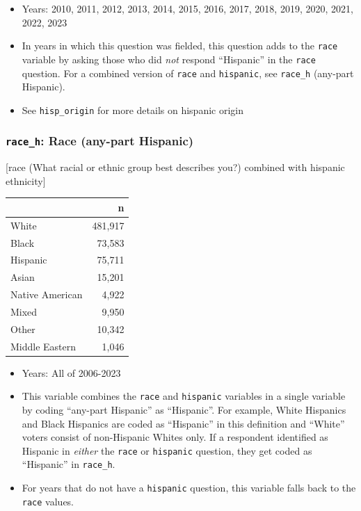 \documentclass[10pt,article,oneside]{memoir}
\theoremstyle{definition}
\begin{document}
\begin{itemize}
\tightlist
\item
  Years: 2010, 2011, 2012, 2013, 2014, 2015, 2016, 2017, 2018, 2019,
  2020, 2021, 2022, 2023
\item
  In years in which this question was fielded, this question adds to the
  \texttt{race} variable by asking those who did \emph{not} respond
  ``Hispanic'' in the \texttt{race} question. For a combined version of
  \texttt{race} and \texttt{hispanic}, see \texttt{race\_h} (any-part
  Hispanic).
\item
  See \texttt{hisp\_origin} for more details on hispanic origin
\end{itemize}

\subsubsection{\texorpdfstring{\texttt{race\_h}: Race (any-part
Hispanic)}{race\_h: Race (any-part Hispanic)}}\label{race_h-race-any-part-hispanic}

{[}race (What racial or ethnic group best describes you?) combined with
hispanic ethnicity{]}

\begin{table}[H]
\centering
\begin{tabular}[t]{lr}
\toprule
 & n\\
\midrule
White & 481,917\\
Black & 73,583\\
Hispanic & 75,711\\
Asian & 15,201\\
Native American & 4,922\\
Mixed & 9,950\\
Other & 10,342\\
Middle Eastern & 1,046\\
\bottomrule
\end{tabular}
\end{table}

\begin{itemize}
\tightlist
\item
  Years: All of 2006-2023
\item
  This variable combines the \texttt{race} and \texttt{hispanic}
  variables in a single variable by coding ``any-part Hispanic'' as
  ``Hispanic''. For example, White Hispanics and Black Hispanics are
  coded as ``Hispanic'' in this definition and ``White'' voters consist
  of non-Hispanic Whites only. If a respondent identified as Hispanic in
  \emph{either} the \texttt{race} or \texttt{hispanic} question, they
  get coded as ``Hispanic'' in \texttt{race\_h}.
\item
  For years that do not have a \texttt{hispanic} question, this variable
  falls back to the \texttt{race} values.
\end{itemize}
\end{document}
